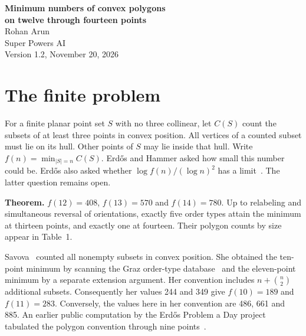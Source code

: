 \documentclass[11pt]{article}
\begin{document}
\begin{center}
{\LARGE\bfseries Minimum numbers of convex polygons\\[3pt] on twelve through fourteen points}\\[12pt]
{\large Rohan Arun}\\[2pt] Super Powers AI\\[4pt]
{\small Version 1.2, November 20, 2026}
\end{center}
\begin{abstract}
Among twelve, thirteen and fourteen planar points with no three collinear, the minimum numbers of convex polygons are 408, 570 and 780, respectively. Up to reflection and relabeling there are five minimizing order types on thirteen points and one on fourteen. Deleting any point from the fourteen-point minimizer leaves at least 574 polygons. We obtain the lower bounds by enumerating orientation signs along a chain of point deletions and certifying the nonrealizability of the remaining exceptions by inequalities between triangle areas. Integer coordinates certify attainment. The same search independently recovers Savova's ten- and eleven-point values.
We also prove that exterior twin pairs cannot occur in a minimizer at any size $n\ge4$.
\end{abstract}
\section{The finite problem}
For a finite planar point set $S$ with no three collinear, let $C(S)$ count the subsets of at least three points in convex position. All vertices of a counted subset must lie on its hull. Other points of $S$ may lie inside that hull. Write $f(n)=\min_{|S|=n}C(S)$. Erd\H{o}s and Hammer asked how small this number could be. Erd\H{o}s also asked whether $\log f(n)/(\log n)^2$ has a limit~\cite{erdos}. The latter question remains open.

\noindent\textbf{Theorem.} $f(12)=408$, $f(13)=570$ and $f(14)=780$. Up to relabeling and simultaneous reversal of orientations, exactly five order types attain the minimum at thirteen points, and exactly one at fourteen. Their polygon counts by size appear in Table~1.

Savova~\cite{savova} counted all nonempty subsets in convex position. She obtained the ten-point minimum by scanning the Graz order-type database~\cite{graz} and the eleven-point minimum by a separate extension argument. Her convention includes $n+\binom n2$ additional subsets. Consequently her values 244 and 349 give $f(10)=189$ and $f(11)=283$. Conversely, the values here in her convention are 486, 661 and 885. An earlier public computation by the Erd\H{o}s Problem a Day project tabulated the polygon convention through nine points~\cite{prior}.
\end{document}
